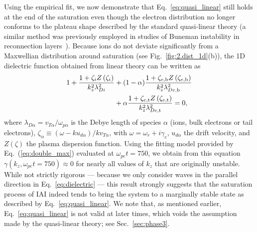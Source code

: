 \documentclass[%
 reprint,
 amsmath,
 amssymb,
 aps,
 prx,
floatfix,
superscriptaddress
]{revtex4-2}
\begin{document}
Using the empirical fit, we now demonstrate that Eq.~\eqref{eq:quasi_linear} still holds at the end of the saturation even though the electron distribution no longer conforms to the plateau shape described by the standard quasi-linear theory (a similar method was previously employed in studies of Buneman instability in reconnection layers~\cite{drake2003formation, che2009nonlinear, che2010electron, jain2011modeling}). 
Because ions do not deviate significantly from a Maxwellian distribution around saturation (see Fig.~\ref{fig:2.dist_1d}(b)), the 1D dielectric function obtained from linear theory can be written as
\begin{equation}
\label{eq:dielectric}
\begin{split}
    1+ \frac{1+\zeta_{i} Z\left(\zeta_{i}\right)}{k_z^{2} \lambda_{D i}^{2}}  &
    +(1-\alpha)\frac{1+\zeta_{e,\rm{b}} Z\left(\zeta_{e,\rm{b}}\right)}{k_z^{2} \lambda_{D e,\rm{b}}^{2}} \\
    &+ \alpha \frac{1+\zeta_{e,\rm{t}} Z\left(\zeta_{e,\rm{t}}\right)}{k_z^{2} \lambda_{D e,\rm{t}}^{2}} = 0,
\end{split}
\end{equation}
where $\lambda_{D\alpha} = v_{T\alpha}/\omega_{p\alpha}$ is the Debye length of species $\alpha$ (ions, bulk electrons or tail electrons), $\zeta_{\alpha} \equiv (\omega - ku_{d\alpha}) / kv_{T\alpha}$, with $\omega = \omega_{r} + i \gamma_e$, $u_{d\alpha}$ the drift velocity, and $Z(\zeta)$ the plasma dispersion function.
Using the fitting model provided by Eq.~(\ref{eq:double_max}) evaluated at $\omega_{pe} t = 750$,  we obtain from this equation $\gamma(k_z,\omega_{pe}t = 750) \approx 0$ for nearly all values of $k_z$ that are originally unstable.
While not strictly rigorous --- because we only consider waves in the parallel direction in Eq.~\eqref{eq:dielectric} --- this result strongly suggests that the saturation process of IAI indeed tends to bring the system to a marginally stable state as described by Eq.~\eqref{eq:quasi_linear}. 
We note that, as mentioned earlier, Eq.~\eqref{eq:quasi_linear} is not valid at later times, which voids the assumption made by the quasi-linear theory; see Sec.~\ref{sec:phase3}.
\end{document}
